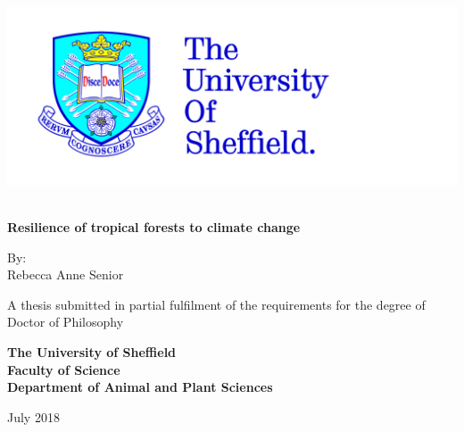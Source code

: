 \thispagestyle{empty}
\begin{center}
\includegraphics{logos/tuoslogo_cmyk_hi.jpg}
\vspace{1.5cm}
 {\Huge\bfseries \\Resilience of tropical forests to climate change\par}
 \vspace{1.5cm}
 {\Large By:\\ Rebecca Anne Senior\par}
 \vspace{1.5cm}
 {A thesis submitted in partial fulfilment of the requirements for the degree of\\ Doctor of Philosophy\par}
 \vspace{2cm}\bfseries
 The University of Sheffield\\
 Faculty of Science\\
 Department of Animal and Plant Sciences\par
 \vfill
 {\large {\normalfont July 2018\par}}
\end{center}

\setlength{\abovedisplayskip}{-5pt}
\setlength{\abovedisplayshortskip}{-5pt}